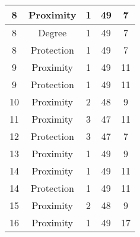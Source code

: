 \documentclass[results.tex]{subfiles}
\begin{document}
\begin{center}
\begin{tabular}{| c || c | c | c | c |}
            \hline
            8                       & Proximity                    & 1                      & 49                      & 7                    \\
            \hline
            8                       & Degree                       & 1                      & 49                      & 7                    \\
            \hline
            8                       & Protection                   & 1                      & 49                      & 7                    \\
            \hline
            9                       & Proximity                    & 1                      & 49                      & 11                   \\
            \hline
            9                       & Protection                   & 1                      & 49                      & 11                   \\
            \hline
            10                      & Proximity                    & 2                      & 48                      & 9                    \\
            \hline
            11                      & Proximity                    & 3                      & 47                      & 11                   \\
            \hline
            12                      & Protection                   & 3                      & 47                      & 7                    \\
            \hline
            13                      & Proximity                    & 1                      & 49                      & 9                    \\
            \hline
            14                      & Proximity                    & 1                      & 49                      & 11                   \\
            \hline
            14                      & Protection                   & 1                      & 49                      & 11                   \\
            \hline
            15                      & Proximity                    & 2                      & 48                      & 9                    \\
            \hline
            16                      & Proximity                    & 1                      & 49                      & 17                   \\

\end{tabular}
\end{center}
\end{document}

